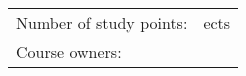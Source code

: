 \ 
\vspace{5cm}

\begin{center}

	
	\Large \textbf \organisatie
	
	\vspace{1.5cm}
	
	\HRule \\[0.4cm]
	
	\Huge \textbf \modulenaam
	
	\vspace{1.7cm}
	
	\Large \textbf  \modulecode
	
	\vspace{0.4cm}
	
	\HRule \\[1.5cm]
\end{center}
\vfill

\begin{tabular}{l l}
	Number of study points:  & \stdPunten{} ects\\
	Course owners: & \author\\
\end{tabular}
